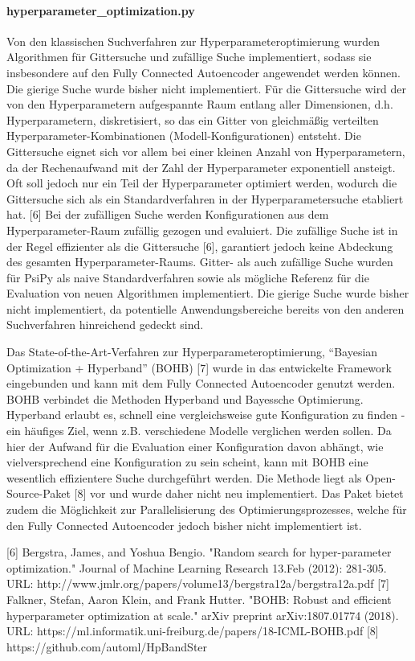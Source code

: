 		\paragraph{hyperparameter\_optimization.py} 
Von den klassischen Suchverfahren zur Hyperparameteroptimierung wurden Algorithmen für Gittersuche und zufällige Suche implementiert, sodass sie insbesondere auf den Fully Connected Autoencoder angewendet werden können. Die gierige Suche wurde bisher nicht implementiert. Für die Gittersuche wird der von den Hyperparametern aufgespannte Raum entlang aller Dimensionen, d.h. Hyperparametern, diskretisiert, so das ein Gitter von gleichmäßig verteilten Hyperparameter-Kombinationen (Modell-Konfigurationen) entsteht. Die Gittersuche eignet sich vor allem bei einer kleinen Anzahl von Hyperparametern, da der Rechenaufwand mit der Zahl der Hyperparameter exponentiell ansteigt. Oft soll jedoch nur ein Teil der Hyperparameter optimiert werden, wodurch die Gittersuche sich als ein Standardverfahren in der Hyperparametersuche etabliert hat. [6]
Bei der zufälligen Suche werden Konfigurationen aus dem Hyperparameter-Raum zufällig gezogen und evaluiert. Die zufällige Suche ist in der Regel effizienter als die Gittersuche [6], garantiert jedoch keine Abdeckung des gesamten Hyperparameter-Raums.
Gitter- als auch zufällige Suche wurden für PsiPy als naive Standardverfahren sowie als mögliche Referenz für die Evaluation von neuen Algorithmen implementiert. Die gierige Suche wurde bisher nicht implementiert, da potentielle Anwendungsbereiche bereits von den anderen Suchverfahren hinreichend gedeckt sind.

Das State-of-the-Art-Verfahren zur Hyperparameteroptimierung, “Bayesian Optimization + Hyperband” (BOHB) [7] wurde in das entwickelte Framework eingebunden und kann mit dem Fully Connected Autoencoder genutzt werden. BOHB verbindet die Methoden Hyperband und Bayessche Optimierung. Hyperband erlaubt es, schnell eine vergleichsweise gute Konfiguration zu finden - ein häufiges Ziel, wenn z.B. verschiedene Modelle verglichen werden sollen. Da hier der Aufwand für die Evaluation einer Konfiguration davon abhängt, wie vielversprechend eine Konfiguration zu sein scheint, kann mit BOHB eine wesentlich effizientere Suche durchgeführt werden. Die Methode liegt als Open-Source-Paket [8] vor und wurde daher nicht neu implementiert. Das Paket bietet zudem die Möglichkeit zur Parallelisierung des Optimierungsprozesses, welche für den Fully Connected Autoencoder jedoch bisher nicht implementiert ist.


[6] Bergstra, James, and Yoshua Bengio. "Random search for hyper-parameter 
optimization." Journal of Machine Learning Research 13.Feb (2012): 281-305.
URL: http://www.jmlr.org/papers/volume13/bergstra12a/bergstra12a.pdf
[7] Falkner, Stefan, Aaron Klein, and Frank Hutter. "BOHB: Robust and efficient 
hyperparameter optimization at scale." arXiv preprint arXiv:1807.01774 (2018).
URL: https://ml.informatik.uni-freiburg.de/papers/18-ICML-BOHB.pdf 
[8] https://github.com/automl/HpBandSter

